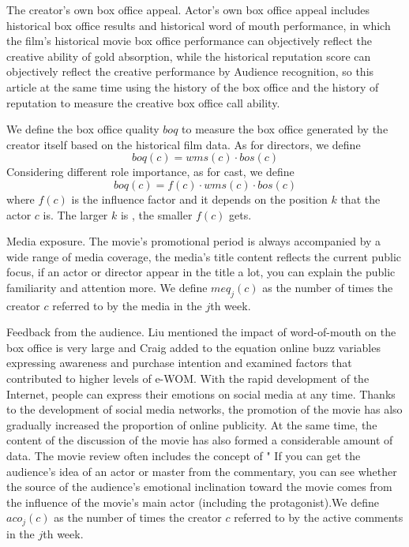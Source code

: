 \par The creator's own box office appeal. Actor's own box office appeal includes historical box office results and historical word of mouth performance, in which the film's historical movie box office performance can objectively reflect the creative ability of gold absorption, while the historical reputation score can objectively reflect the creative performance by Audience recognition, so this article at the same time using the history of the box office and the history of reputation to measure the creative box office call ability.
\par We define the box office quality $boq$ to measure the box office generated by the creator itself based on the historical film data. 
As for directors, we define 
\begin{equation}
   boq(c)=wms(c)\cdot bos(c)
\end{equation}
Considering different role importance, as for cast, we define 
\begin{equation}
    boq(c) = f(c)\cdot wms(c)\cdot bos(c)
\end{equation}
where $f(c)$ is the influence factor and it depends on the position $k$ that the actor $c$ is. The larger $k$ is , the smaller $f(c)$ gets.
\par Media exposure. The movie's promotional period is always accompanied by a wide range of media coverage, the media's title content reflects the current public focus, if an actor or director appear in the title a lot, you can explain the public familiarity and attention more. We define $meq_j(c)$ as the number of times the creator $c$ referred to by the media in the $j$th week.\\
\par Feedback from the audience. Liu \cite{liu2006word} mentioned the impact of word-of-mouth on the box office is very large and Craig \cite{craig2015word}added to the equation online buzz variables expressing awareness and purchase intention and examined factors that contributed to higher levels of e-WOM. With the rapid development of the Internet, people can express their emotions on social media at any time. Thanks to the development of social media networks, the promotion of the movie has also gradually increased the proportion of online publicity. At the same time, the content of the discussion of the movie has also formed a considerable amount of data. The movie review often includes the concept of " If you can get the audience's idea of ​​an actor or master from the commentary, you can see whether the source of the audience's emotional inclination toward the movie comes from the influence of the movie's main actor (including the protagonist).We define $aco_j(c)$ as the number of times the creator $c$ referred to by the active comments in the $j$th week.\\\\
